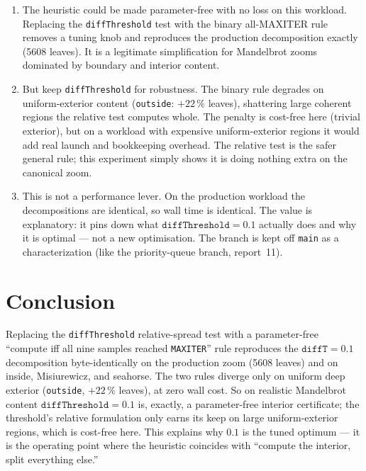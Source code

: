 \documentclass[
	english,
	letterpaper, oneside
]{article}
\begin{document}
\begin{enumerate}
  \item The heuristic could be made parameter-free with no loss on this
        workload. Replacing the \texttt{diffThreshold} test with the binary
        all-MAXITER rule removes a tuning knob and reproduces the production
        decomposition exactly (5608 leaves). It is a legitimate simplification
        for Mandelbrot zooms dominated by boundary and interior content.
  \item But keep \texttt{diffThreshold} for robustness. The binary rule
        degrades on uniform-exterior content (\texttt{outside}: $+22\,\%$
        leaves), shattering large coherent regions the relative test computes
        whole. The penalty is cost-free here (trivial exterior), but on a
        workload with expensive uniform-exterior regions it would add real launch
        and bookkeeping overhead. The relative test is the safer general rule;
        this experiment simply shows it is doing nothing extra on the canonical
        zoom.
  \item This is not a performance lever. On the production workload the
        decompositions are identical, so wall time is identical. The value is
        explanatory: it pins down what $\texttt{diffThreshold}=0.1$ actually does
        and why it is optimal --- not a new optimisation. The branch is kept off
        \texttt{main} as a characterization (like the priority-queue branch,
        report~11).
\end{enumerate}

\section{Conclusion}

Replacing the \texttt{diffThreshold} relative-spread test with a parameter-free
``compute iff all nine samples reached \texttt{MAXITER}'' rule reproduces the
$\texttt{diffT}=0.1$ decomposition byte-identically on the production
zoom (5608 leaves) and on inside, Misiurewicz, and seahorse. The two rules diverge
only on uniform deep exterior (\texttt{outside}, $+22\,\%$ leaves), at zero wall
cost. So on realistic Mandelbrot content $\texttt{diffThreshold}=0.1$ is, exactly,
a parameter-free interior certificate; the threshold's relative formulation only
earns its keep on large uniform-exterior regions, which is cost-free here. This
explains why $0.1$ is the tuned optimum --- it is the operating point where the
heuristic coincides with ``compute the interior, split everything else.''
\end{document}
